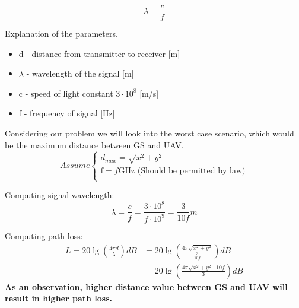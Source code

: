 \begin{equation}\label{eq:vel_freq_wavelen1}
	\lambda = \frac{c}{f}
\end{equation}

Explanation of the parameters.
\begin{itemize}
	\item d - distance from transmitter to receiver [m]
	\item $\lambda$ - wavelength of the signal [m]
	\item c - speed of light constant $3\cdot 10^8$ [m/s] 
	\item f - frequency of signal [Hz]
\end{itemize}

Considering our problem we will look into the worst case scenario, which would be the maximum distance between GS and UAV. 
\begin{equation*}
	Assume 
	\begin{cases}
	d_{max} = \sqrt{x^2+y^2}\\
	\text{f} = f\text{GHz (Should be permitted by law})\\
	\end{cases}
\end{equation*}

Computing signal wavelength:
\begin{equation}\label{eq:vel_freq_wavelen2}
	\lambda = \frac{c}{f} 
	        = \frac{3\cdot 10^{8}}{f\cdot 10^{9}}
	        = \frac{3}{10f}m
\end{equation}

Computing path loss:
\begin{align*}\label{eq:path_loses_calc}
	L = 20\lg\left (\frac{4\pi d}{\lambda} \right) dB 
	 &= 20\lg\left (\frac{4\pi \sqrt{x^2+y^2}}{\frac{3}{10f}} \right) dB\\ 
	 &= 20\lg\left (\frac{4\pi \sqrt{x^2+y^2}\cdot 10f}{ 3} \right) dB
\end{align*}
\noindent \textbf{As an observation, higher distance value between GS and UAV will result in higher path loss.}
